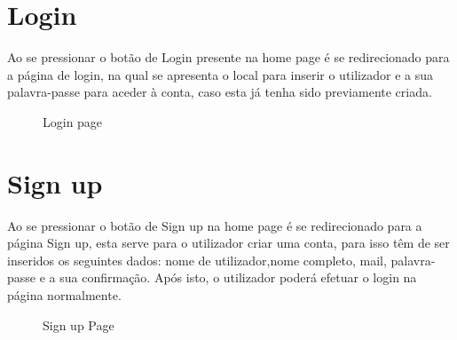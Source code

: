 \documentclass[12pt]{report}
\begin{document}
\section{Login}
\quad Ao se pressionar o botão de Login presente na home page é se redirecionado para a página de login, na qual se apresenta o local para inserir o utilizador e a sua palavra-passe para aceder à conta, caso esta já tenha sido previamente criada.
\begin{figure}[H]{
{
\caption{Login page}
}
}\end{figure}


\section{Sign up}
\quad Ao se pressionar o botão de Sign up na home page é se redirecionado para a página Sign up, esta serve para o utilizador criar uma conta, para isso têm de ser inseridos os seguintes dados: nome de utilizador,nome completo, mail, palavra-passe e a sua confirmação. Após isto, o utilizador poderá efetuar o login na página normalmente.
\begin{figure}[H]{
{
\caption{Sign up Page}
}
}\end{figure}
\end{document}
